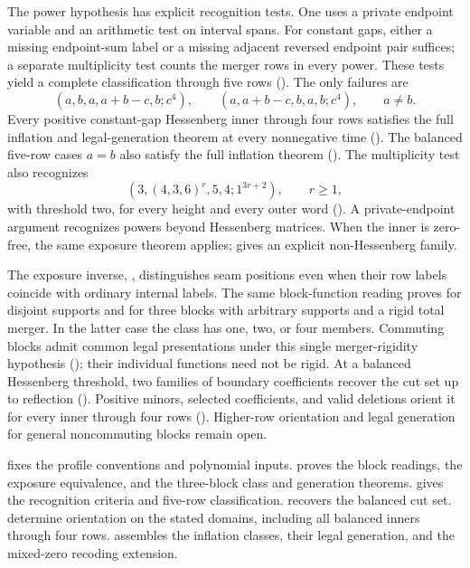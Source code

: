 \documentclass[11pt,a4paper]{amsart}
\numberwithin{equation}{section}
\theoremstyle{plain}
\theoremstyle{definition}
\begin{document}
The power hypothesis has explicit recognition tests.  One uses a private endpoint variable and an arithmetic test on interval spans.  For constant gaps, either a missing endpoint-sum label or a missing adjacent reversed endpoint pair suffices; a separate multiplicity test counts the merger rows in every power.  These tests yield a complete classification through five rows ().  The only failures are
\[
 (a,b,a,a+b-c,b;c^4),\qquad
 (a,a+b-c,b,a,b;c^4),\qquad a\ne b.
\]
Every positive constant-gap Hessenberg inner through four rows satisfies the full inflation and legal-generation theorem at every nonnegative time ().  The balanced five-row cases \(a=b\) also satisfy the full inflation theorem ().  The multiplicity test also recognizes
\[
 (3,(4,3,6)^r,5,4;1^{3r+2}),\qquad r\ge1,
\]
with threshold two, for every height and every outer word ().  A private-endpoint argument recognizes powers beyond Hessenberg matrices.  When the inner is zero-free, the same exposure theorem applies;  gives an explicit non-Hessenberg family.

The exposure inverse, , distinguishes seam positions even when their row labels coincide with ordinary internal labels.  The same block-function reading proves  for disjoint supports and  for three blocks with arbitrary supports and a rigid total merger.  In the latter case the class has one, two, or four members.  Commuting blocks admit common legal presentations under this single merger-rigidity hypothesis (); their individual functions need not be rigid.  At a balanced Hessenberg threshold, two families of boundary coefficients recover the cut set up to reflection ().  Positive minors, selected coefficients, and valid deletions orient it for every inner through four rows ().  Higher-row orientation and legal generation for general noncommuting blocks remain open.

 fixes the profile conventions and polynomial inputs.   proves the block readings, the exposure equivalence, and the three-block class and generation theorems.   gives the recognition criteria and five-row classification.   recovers the balanced cut set.   determine orientation on the stated domains, including all balanced inners through four rows.   assembles the inflation classes, their legal generation, and the mixed-zero recoding extension.
\end{document}
